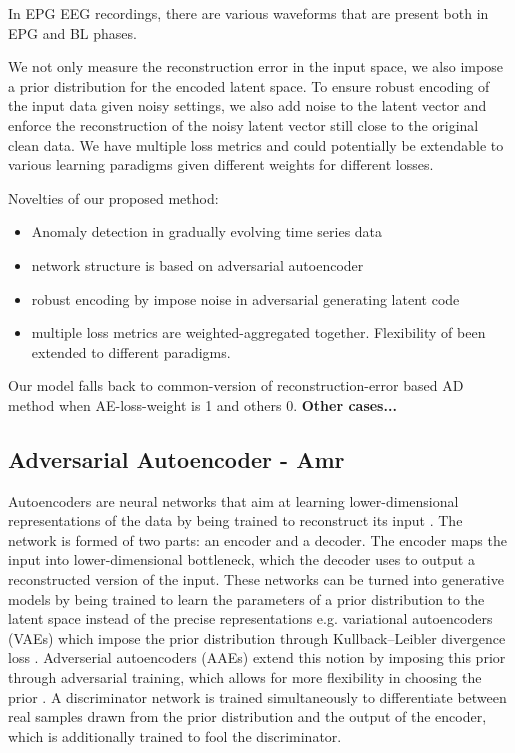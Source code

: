 \documentclass[pmlr]{jmlr}%
\begin{document}
In EPG EEG recordings, there are various waveforms that are present both in EPG and BL phases.


We not only measure the reconstruction error in the input space, we also impose a prior distribution for the encoded latent space. To ensure robust encoding of the input data given noisy settings, we also add noise to the latent vector and enforce the reconstruction of the noisy latent vector still close to the original clean data. We have multiple loss metrics and could potentially be extendable to various learning paradigms given different weights for different losses.



Novelties of our proposed method:
\begin{itemize}
	\item Anomaly detection in gradually evolving time series data
	\item network structure is based on adversarial autoencoder
	\item robust encoding by impose noise in adversarial generating latent code
	\item multiple loss metrics are weighted-aggregated together. Flexibility of been extended to different paradigms. 
\end{itemize}
Our model falls back to common-version of reconstruction-error based AD method when AE-loss-weight is 1 and others 0. \textbf{Other cases...}



\subsection{Adversarial Autoencoder - Amr}
Autoencoders are neural networks that aim at learning lower-dimensional representations of the data by being trained to reconstruct its input \cite{Hinton2006}. The network is formed of two parts: an encoder and a decoder. The encoder maps the input into lower-dimensional bottleneck, which the decoder uses to output a reconstructed version of the input. These networks can be turned into generative models by being trained to learn the parameters of a prior distribution to the latent space instead of the precise representations e.g. variational autoencoders (VAEs) which impose the prior distribution through Kullback–Leibler divergence loss \cite{Kingma2013}. Adverserial autoencoders (AAEs) extend this notion by imposing this prior through adversarial training, which allows for more flexibility in choosing the prior \cite{makhzani2015adversarial}. A discriminator network is trained simultaneously to differentiate between real samples drawn from the prior distribution and the output of the encoder, which is additionally trained to fool the discriminator.  
\end{document}

